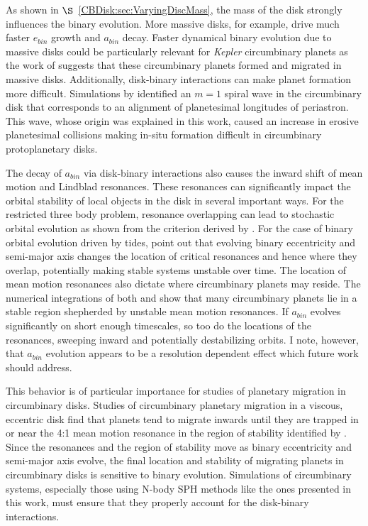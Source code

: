 As shown in $\S$~\ref{CBDisk:sec:VaryingDiscMass}, the mass of the disk strongly influences the binary evolution.  More massive disks, for example, drive much faster 
$e_{bin}$ growth and $a_{bin}$ decay.  Faster dynamical binary evolution due to massive disks could be particularly relevant for {\em Kepler} circumbinary 
planets as the work of \citet{Dunhill2013} suggests that these circumbinary planets formed and migrated in massive disks.  Additionally, disk-binary interactions 
can make planet formation more difficult.  Simulations by \citet{Lines2016} identified an $m = 1$ spiral wave in the circumbinary disk that corresponds to an 
alignment of planetesimal longitudes of periastron.  This wave, whose origin was explained in this work, caused an increase in erosive planetesimal 
collisions making in-situ formation difficult in circumbinary protoplanetary disks.

The decay of $a_{bin}$ via disk-binary interactions also causes the inward shift of mean motion and Lindblad resonances.  These resonances can significantly 
impact the orbital stability of local objects in the disk in several important ways.  For the restricted three body problem, resonance overlapping can lead to 
stochastic orbital evolution as shown from the criterion derived by \citet{Wisdom1980}.  For the case of binary orbital evolution driven by tides, \citet{Bromley2015} 
point out that evolving binary eccentricity and semi-major axis changes the location of critical resonances and hence where they overlap, potentially making 
stable systems unstable over time.  The location of mean motion resonances also dictate where circumbinary planets may reside.  The numerical integrations 
of both \citet{Popova2013} and \citet{Chavez2015} show that many circumbinary planets lie in a stable region shepherded by unstable mean motion resonances.  If 
$a_{bin}$ evolves significantly on short enough timescales, so too do the locations of the resonances, sweeping inward and potentially destabilizing orbits.  
I note, however, that $a_{bin}$ evolution appears to be a resolution dependent effect which future work should address.

This behavior is of particular importance for studies of planetary migration in circumbinary disks.  Studies of circumbinary planetary migration in a viscous, 
eccentric disk find that planets tend to migrate inwards until they are trapped in or near the 4:1 mean motion resonance in the region of stability identified by 
\citet{Holman1999} \citep{Nelson2003,Kley2014}.  Since the resonances and the region of stability move as binary eccentricity and semi-major axis evolve, the 
final location and stability of migrating planets in circumbinary disks is sensitive to binary evolution.  Simulations of circumbinary systems, especially those 
using N-body SPH methods like the ones presented in this work, must ensure that they properly account for the disk-binary interactions.

